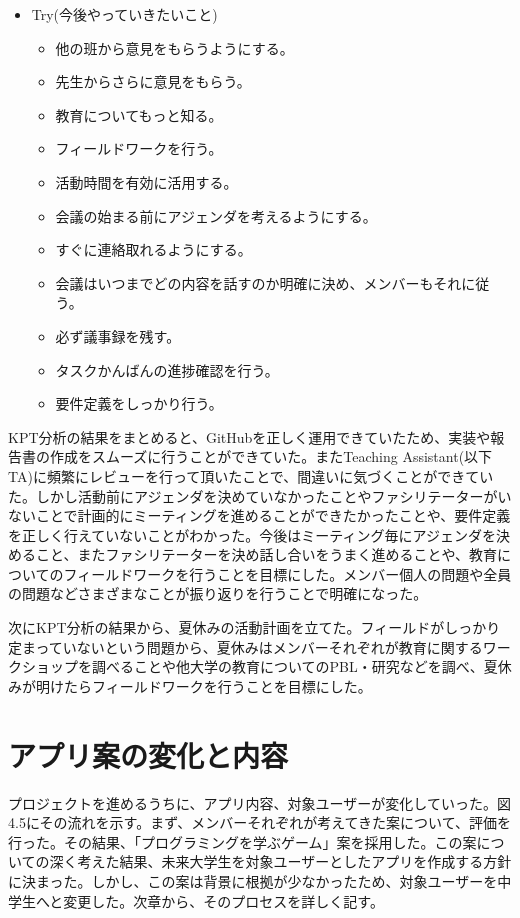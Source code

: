 \documentclass[openany,11pt,papersize]{jsbook}
\begin{document}
\begin{itemize}
\item
Try(今後やっていきたいこと)
\begin{itemize}
\item
他の班から意見をもらうようにする。
\item
先生からさらに意見をもらう。
\item
教育についてもっと知る。
\item
フィールドワークを行う。
\item
活動時間を有効に活用する。
\item
会議の始まる前にアジェンダを考えるようにする。
\item
すぐに連絡取れるようにする。
\item
会議はいつまでどの内容を話すのか明確に決め、メンバーもそれに従う。
\item
必ず議事録を残す。
\item
タスクかんばんの進捗確認を行う。
\item
要件定義をしっかり行う。
\end{itemize}

\end{itemize}

KPT分析の結果をまとめると、GitHubを正しく運用できていたため、実装や報告書の作成をスムーズに行うことができていた。またTeaching Assistant(以下 TA)に頻繁にレビューを行って頂いたことで、間違いに気づくことができていた。しかし活動前にアジェンダを決めていなかったことやファシリテーターがいないことで計画的にミーティングを進めることができたかったことや、要件定義を正しく行えていないことがわかった。今後はミーティング毎にアジェンダを決めること、またファシリテーターを決め話し合いをうまく進めることや、教育についてのフィールドワークを行うことを目標にした。メンバー個人の問題や全員の問題などさまざまなことが振り返りを行うことで明確になった。

\par
次にKPT分析の結果から、夏休みの活動計画を立てた。フィールドがしっかり定まっていないという問題から、夏休みはメンバーそれぞれが教育に関するワークショップを調べることや他大学の教育についてのPBL・研究などを調べ、夏休みが明けたらフィールドワークを行うことを目標にした。

\section{アプリ案の変化と内容}
\par プロジェクトを進めるうちに、アプリ内容、対象ユーザーが変化していった。図4.5にその流れを示す。まず、メンバーそれぞれが考えてきた案について、評価を行った。その結果、「プログラミングを学ぶゲーム」案を採用した。この案についての深く考えた結果、未来大学生を対象ユーザーとしたアプリを作成する方針に決まった。しかし、この案は背景に根拠が少なかったため、対象ユーザーを中学生へと変更した。次章から、そのプロセスを詳しく記す。
\end{document}
